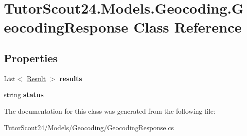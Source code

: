 \hypertarget{class_tutor_scout24_1_1_models_1_1_geocoding_1_1_geocoding_response}{}\section{Tutor\+Scout24.\+Models.\+Geocoding.\+Geocoding\+Response Class Reference}
\label{class_tutor_scout24_1_1_models_1_1_geocoding_1_1_geocoding_response}
\subsection*{Properties}
\begin{DoxyCompactItemize}
\item 
\mbox{\label{class_tutor_scout24_1_1_models_1_1_geocoding_1_1_geocoding_response_af7d663cb48b40dbf3d618667db6c3990}} 
List$<$ \mbox{\hyperlink{class_tutor_scout24_1_1_models_1_1_geocoding_1_1_result}{Result}} $>$ {\bfseries results}
\item 
\mbox{\label{class_tutor_scout24_1_1_models_1_1_geocoding_1_1_geocoding_response_ad66d349f3ea744e35d0088b4a6ef2817}} 
string {\bfseries status}
\end{DoxyCompactItemize}


The documentation for this class was generated from the following file\+:\begin{DoxyCompactItemize}
\item 
Tutor\+Scout24/\+Models/\+Geocoding/Geocoding\+Response.\+cs\end{DoxyCompactItemize}
